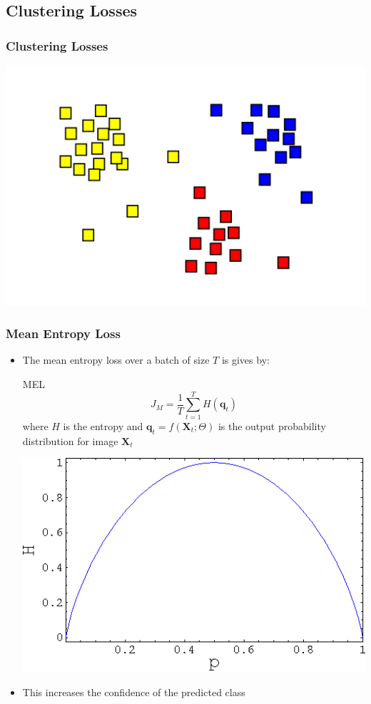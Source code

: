 \subsection{Clustering Losses}

\begin{frame}
	\frametitle{Clustering Losses}
	\includegraphics[scale=0.2, center]{images/clust1}
\end{frame}

\begin{frame}
	\frametitle{Mean Entropy Loss}
	\begin{itemize}
		\item The mean entropy loss over a batch of size $T$ is gives by:
			\begin{block}{MEL}
				\begin{equation*}
					J_M = \frac{1}{T}\sum_{t=1}^{T}H(\mathbf{q}_t)
				\end{equation*}
				where $H$ is the entropy and $\mathbf{q}_t = f(\mathbf{X}_t; \Theta)$ is the output
				probability distribution for image $\mathbf{X}_t$
			\end{block}
			\includegraphics[scale=0.18, center]{images/ent.png}
		\item This increases the confidence of the predicted class
	\end{itemize}
\end{frame}

